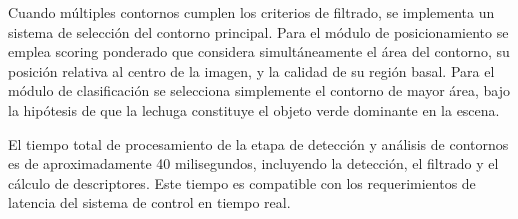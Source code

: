Cuando múltiples contornos cumplen los criterios de filtrado, se implementa un sistema de selección del contorno principal. Para el módulo de posicionamiento se emplea scoring ponderado que considera simultáneamente el área del contorno, su posición relativa al centro de la imagen, y la calidad de su región basal. Para el módulo de clasificación se selecciona simplemente el contorno de mayor área, bajo la hipótesis de que la lechuga constituye el objeto verde dominante en la escena.

El tiempo total de procesamiento de la etapa de detección y análisis de contornos es de aproximadamente 40 milisegundos, incluyendo la detección, el filtrado y el cálculo de descriptores. Este tiempo es compatible con los requerimientos de latencia del sistema de control en tiempo real.